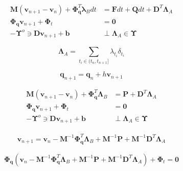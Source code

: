 \documentclass[12pt]{article}
\begin{document}
        \newpage

        \begin{equation}
            \begin{aligned}
                \mathbf{M}(\mathbf{v}_{n+1}-\mathbf{v}_n)+\boldsymbol{\Phi}_{\mathbf{q}}^T\boldsymbol{\lambda}_Bdt
                &=\mathbf{F}dt+\mathbf{Q}dt+\mathbf{D}^T\boldsymbol{\Lambda}_{A}\\
                \boldsymbol{\Phi}_{\mathbf{q}}\mathbf{v}_{n+1}+\boldsymbol{\Phi}_t&=\mathbf{0}\\
                -\boldsymbol{\Upsilon}^o\ni\mathbf{Dv}_{n+1}+\mathbf{b} &\perp \boldsymbol{\Lambda}_A\in \boldsymbol{\Upsilon}
            \end{aligned}
        \end{equation}

        $$\boldsymbol{\Lambda}_{A}=\sum_{t_i\in(t_n,t_{n+1}]}{\lambda_{t_i}\delta_{t_i}}$$

        \begin{equation}
            \mathbf{q}_{n+1}=\mathbf{q}_{n}+h\mathbf{v}_{n+1}
        \end{equation}

        \begin{equation}
            \begin{aligned}
                \mathbf{M}(\mathbf{v}_{n+1}-\mathbf{v}_n)+\boldsymbol{\Phi}_{\mathbf{q}}^T\boldsymbol{\Lambda}_B
                &=\mathbf{P}+\mathbf{D}^T\boldsymbol{\Lambda}_{A}\\
                \boldsymbol{\Phi}_{\mathbf{q}}\mathbf{v}_{n+1}+\boldsymbol{\Phi}_t&=\mathbf{0}\\
                -\boldsymbol{\Upsilon}^o\ni\mathbf{Dv}_{n+1}+\mathbf{b} &\perp \boldsymbol{\Lambda}_A\in \boldsymbol{\Upsilon}
            \end{aligned}
        \end{equation}

        \begin{equation}
            \begin{aligned}
                \mathbf{v}_{n+1}=\mathbf{v}_n-\mathbf{M}^{-1}\boldsymbol{\Phi}_{\mathbf{q}}^T\boldsymbol{\Lambda}_B
                +\mathbf{M}^{-1}\mathbf{P}+\mathbf{M}^{-1}\mathbf{D}^T\boldsymbol{\Lambda}_{A}
            \end{aligned}
        \end{equation}

        $$\boldsymbol{\Phi}_{\mathbf{q}}(\mathbf{v}_n-\mathbf{M}^{-1}\boldsymbol{\Phi}_{\mathbf{q}}^T\boldsymbol{\Lambda}_B
        +\mathbf{M}^{-1}\mathbf{P}+\mathbf{M}^{-1}\mathbf{D}^T\boldsymbol{\Lambda}_{A})+\boldsymbol{\Phi}_t=\mathbf{0}$$
\end{document}
